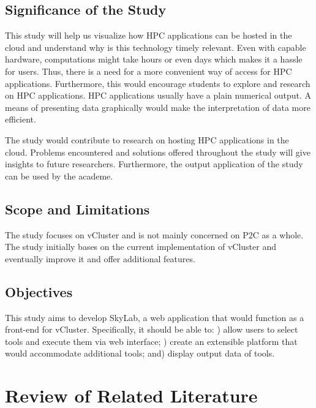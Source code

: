 \documentclass[journal]{./IEEE/IEEEtran}
\begin{document}
    \subsection{Significance of the Study}
    This study will help us visualize how HPC applications can be hosted in the cloud and understand why is this technology timely relevant.  Even with capable hardware, computations might take hours or even days which makes it a hassle for users. Thus, there is a need for a more convenient way of access for HPC applications. Furthermore, this would encourage students to explore and research on HPC applications. HPC applications usually have a plain numerical output. A means of presenting data graphically would make the interpretation of data more efficient.

    The study would contribute to research on hosting HPC applications in the cloud. Problems encountered and solutions offered throughout the study will give insights to future researchers. Furthermore, the output application of the study can be used by the academe.

    \subsection{Scope and Limitations}
    The study focuses on vCluster and is not mainly concerned on P2C as a whole. The study initially bases on the current implementation of vCluster and eventually improve it and offer additional features\cite {Hermocilla2014}.

    \subsection{Objectives}
    This study aims to develop SkyLab, a web application that would function as a front-end for vCluster. %
	Specifically, it should be able to: ) allow users to select tools and execute them via web interface; ) create an extensible platform that would accommodate additional tools; and) display output data of tools.

\section {Review of Related Literature}
\end{document}
